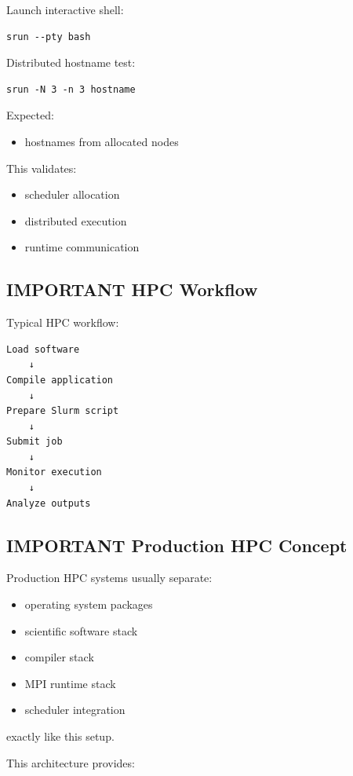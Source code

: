 \documentclass[11pt]{article}
\begin{document}
Launch interactive shell:

\begin{verbatim}
srun --pty bash
\end{verbatim}

Distributed hostname test:

\begin{verbatim}
srun -N 3 -n 3 hostname
\end{verbatim}

Expected:
\begin{itemize}
\item hostnames from allocated nodes
\end{itemize}

This validates:

\begin{itemize}
\item scheduler allocation
\item distributed execution
\item runtime communication
\end{itemize}
\subsection{IMPORTANT HPC Workflow}
\label{sec:org18c32e2}

Typical HPC workflow:

\begin{verbatim}
Load software
    ↓
Compile application
    ↓
Prepare Slurm script
    ↓
Submit job
    ↓
Monitor execution
    ↓
Analyze outputs
\end{verbatim}
\subsection{IMPORTANT Production HPC Concept}
\label{sec:org1598014}

Production HPC systems usually separate:

\begin{itemize}
\item operating system packages
\item scientific software stack
\item compiler stack
\item MPI runtime stack
\item scheduler integration
\end{itemize}

exactly like this setup.

This architecture provides:
\end{document}
